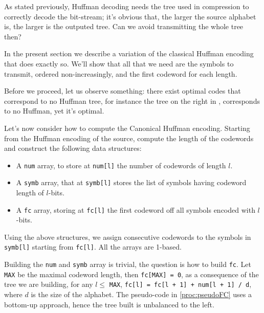 \documentclass{subfiles}
\begin{document}
    As stated previously, Huffman decoding needs the tree used in compression 
        to correctly decode the bit-stream; it's obvious that, the larger the 
        source alphabet is, the larger is the outputed tree.
        Can we avoid transmitting the whole tree then? 

    In the present section we describe a variation of the classical Huffman 
        encoding that does exactly so. We'll show that all that we need are 
        the symbols to transmit, ordered non-increasingly, and the first 
        codeword for each length.

    Before we proceed, let us observe something: there exist optimal codes 
        that correspond to no Huffman tree, for instance the tree 
        on the right in , corresponds to no Huffman, yet it's optimal.
        
    Let's now consider how to compute the Canonical Huffman encoding.
        Starting from the Huffman encoding of the source,
        compute the length of the codewords and construct the following data structures:
        \begin{itemize}
            \item A \lstinline{num} array, to store at \lstinline{num[l]} the number 
                of codewords of length \(l\).
            \item A \lstinline{symb} array, that at \lstinline{symb[l]} stores 
                the list of symbols having codeword length of \(l\)-bits.
            \item A \lstinline{fc} array, storing at \lstinline{fc[l]}
                the first codeword off all symbols encoded with \(l\)-bits.
        \end{itemize}

        
        
        Using the above structures, we assign consecutive codewords to the symbols 
            in \lstinline{symb[l]} starting from \lstinline{fc[l]}. 
            All the arrays are 1-based.

    Building the \lstinline{num} and \lstinline{symb} array is trivial,
        the question is how to build \lstinline{fc}. Let \lstinline{MAX}
        be the maximal codeword length, then \lstinline{fc[MAX] = 0},
        as a consequence of the tree we are building, for any \(l \le\) \lstinline{MAX},
        \lstinline{fc[l] = fc[l + 1] + num[l + 1] / d}, where \(d\) is the size of the alphabet.
        The pseudo-code in \autoref{proc:pseudoFC} uses a bottom-up approach, hence the tree built is 
        unbalanced to the left.
        
\end{document}
